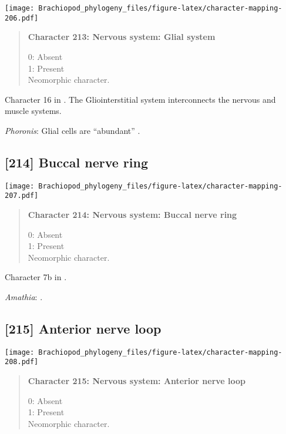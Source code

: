 \documentclass[openany]{book}
\theoremstyle{definition}
\theoremstyle{definition}
\theoremstyle{definition}
\theoremstyle{remark}
\begin{document}
\texttt{[image: Brachiopod\_phylogeny\_files/figure-latex/character-mapping-206.pdf]}

\begin{quote}
\textbf{Character 213: Nervous system: Glial system}

0: Absent\\
1: Present\\
Neomorphic character.
\end{quote}

Character 16 in \citet{Haszprunar1996}. The Gliointerstitial system
interconnects the nervous and muscle systems.

\hypertarget{Phoronis-coding-213}{}
\emph{Phoronis}: Glial cells are ``abundant''
\citep{Temereva2016Phoronida}.

\subsection*{{[}214{]} Buccal nerve ring}\label{buccal-nerve-ring}

\texttt{[image: Brachiopod\_phylogeny\_files/figure-latex/character-mapping-207.pdf]}

\begin{quote}
\textbf{Character 214: Nervous system: Buccal nerve ring}

0: Absent\\
1: Present\\
Neomorphic character.
\end{quote}

Character 7b in \citet{Haszprunar2008}.

\hypertarget{Amathia-coding-214}{}
\emph{Amathia}: \citet{Temereva2016Thenervous}.

\subsection*{{[}215{]} Anterior nerve loop}\label{anterior-nerve-loop}

\texttt{[image: Brachiopod\_phylogeny\_files/figure-latex/character-mapping-208.pdf]}

\begin{quote}
\textbf{Character 215: Nervous system: Anterior nerve loop}

0: Absent\\
1: Present\\
Neomorphic character.
\end{quote}
\end{document}

